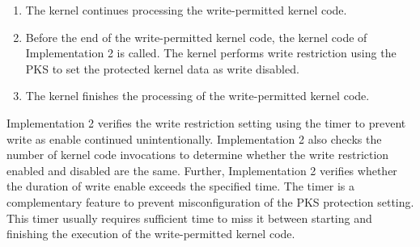 \begin{enumerate}[topsep=0pt]
\begin{enumerate}[topsep=0pt]
\end{enumerate}
  
\item The kernel continues processing the write-permitted kernel code.
\item Before the end of the write-permitted kernel code, the kernel code of
Implementation 2 is called. The kernel performs write restriction using the PKS to set the
protected kernel data as write disabled.
\item The kernel finishes the processing of the write-permitted kernel code.

\end{enumerate}


%
Implementation 2 verifies the write restriction setting using the timer to
prevent write as enable continued unintentionally.
%
Implementation 2 also checks the number of kernel code invocations to determine whether the
write restriction enabled and disabled are the same.
%
Further, Implementation 2 verifies whether the duration of write enable exceeds
the specified time.
%
The timer is a complementary feature to prevent misconfiguration of
  the PKS protection setting. 
%
This timer usually requires sufficient time to miss it between starting and
finishing the execution of the write-permitted kernel code.



